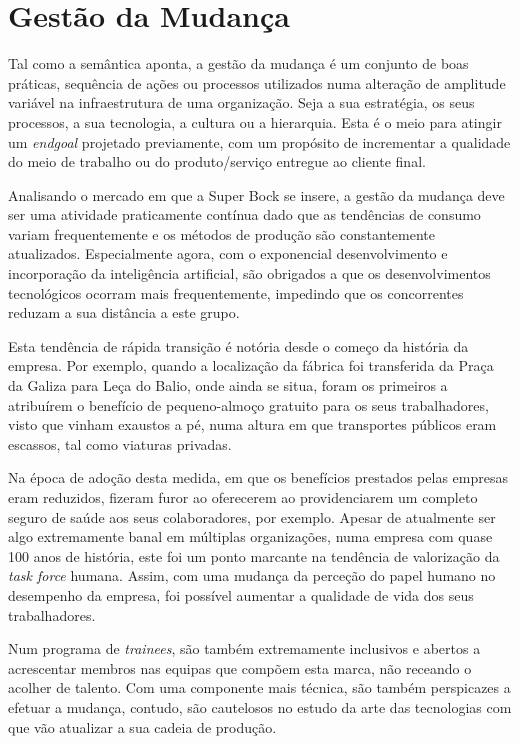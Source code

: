 \section{Gestão da Mudança}
Tal como a semântica aponta, a gestão da mudança é um conjunto de boas práticas, sequência de ações ou processos utilizados numa alteração de amplitude variável na infraestrutura de uma organização. Seja a sua estratégia, os seus processos, a sua tecnologia, a cultura ou a hierarquia. Esta é o meio para atingir um \textit{endgoal} projetado previamente, com um propósito de incrementar a qualidade do meio de trabalho ou do produto/serviço entregue ao cliente final. 

Analisando o mercado em que a Super Bock se insere, a gestão da mudança deve ser uma atividade praticamente contínua dado que as tendências de consumo variam frequentemente e os métodos de produção são constantemente atualizados. Especialmente agora, com o exponencial desenvolvimento e incorporação da inteligência artificial, são obrigados a que os desenvolvimentos tecnológicos ocorram mais frequentemente, impedindo que os concorrentes reduzam a sua distância a este grupo. 

Esta tendência de rápida transição é notória desde o começo da história da empresa. Por exemplo, quando a localização da fábrica foi transferida da Praça da Galiza para Leça do Balio, onde ainda se situa, foram os primeiros a atribuírem o benefício de pequeno-almoço gratuito para os seus trabalhadores, visto que vinham exaustos a pé, numa altura em que transportes públicos eram escassos, tal como viaturas privadas.  

Na época de adoção desta medida, em que os benefícios prestados pelas empresas eram reduzidos, fizeram furor ao oferecerem ao providenciarem um completo seguro de saúde aos seus colaboradores, por exemplo. Apesar de atualmente ser algo extremamente banal em múltiplas organizações, numa empresa com quase 100 anos de história, este foi um ponto marcante na tendência de valorização da \textit{task force} humana. Assim, com uma mudança da perceção do papel humano no desempenho da empresa, foi possível aumentar a qualidade de vida dos seus trabalhadores. 

Num programa de \textit{trainees}, são também extremamente inclusivos e abertos a acrescentar membros nas equipas que compõem esta marca, não receando o acolher de talento. Com uma componente mais técnica, são também perspicazes a efetuar a mudança, contudo, são cautelosos no estudo da arte das tecnologias com que vão atualizar a sua cadeia de produção. 

